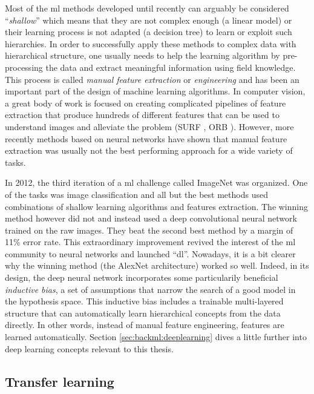 Most of the \acrlong{ml} methods developed until recently can arguably be considered ``\textit{shallow}'' which means that they are not complex enough (\eg a linear model) or their learning process is not adapted (\eg a decision tree) to learn or exploit such hierarchies. In order to successfully apply these methods to complex data with hierarchical structure, one usually needs to help the learning algorithm by pre-processing the data and extract meaningful information using field knowledge. This process is called \textit{manual feature extraction} or \textit{engineering} and has been an important part of the design of machine learning algorithms. In computer vision, a great body of work is focused on creating complicated pipelines of feature extraction that produce hundreds of different features that can be used to understand images and alleviate the problem (\eg SURF \parencite{bay2006surf}, ORB \parencite{rublee2011orb}). However, more recently methods based on neural networks have shown that manual feature extraction was usually not the best performing approach for a wide variety of tasks.

In 2012, the third iteration of a \acrlong{ml} challenge called ImageNet \parencite{russakovsky2015imagenet} was organized. One of the tasks was image classification and all but the best methods used combinations of shallow learning algorithms and features extraction. The winning method \parencite{krizhevsky2012imagenet} however did not and instead used a deep convolutional neural network trained on the raw images. They beat the second best method by a margin of 11\% error rate. This extraordinary improvement revived the interest of the \acrlong{ml} community to neural networks and launched ``\acrlong{dl}''. Nowadays, it is a bit clearer why the winning method (\ie the AlexNet architecture) worked so well. Indeed, in its design, the deep neural network incorporates some particularily beneficial \textit{inductive bias}, a set of assumptions that narrow the search of a good model in the hypothesis space. This inductive bias includes a trainable multi-layered structure that can automatically learn hierarchical concepts from the data directly. In other words, instead of manual feature engineering, features are learned automatically. Section \ref{sec:backml:deeplearning} dives a little further into deep learning concepts relevant to this thesis.

\subsection{Transfer learning}
\label{ssec:backml:transfer}

